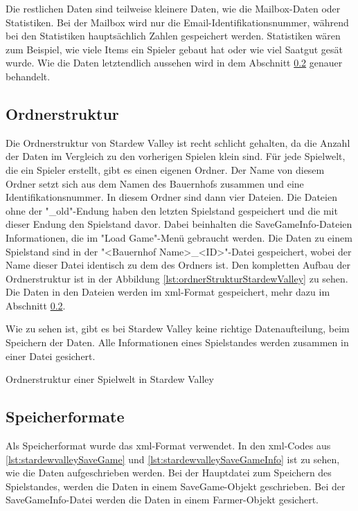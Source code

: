 Die restlichen Daten sind teilweise kleinere Daten, wie die Mailbox-Daten oder Statistiken. Bei der Mailbox wird nur die Email-Identifikationsnummer, während bei den Statistiken hauptsächlich Zahlen gespeichert werden. Statistiken wären zum Beispiel, wie viele Items ein Spieler gebaut hat oder wie viel Saatgut gesät wurde. Wie die Daten letztendlich aussehen wird in dem Abschnitt \ref{ssec:speicherformateStardew} genauer behandelt.

\subsection{Ordnerstruktur}
Die Ordnerstruktur von Stardew Valley ist recht schlicht gehalten, da die Anzahl der Daten im Vergleich zu den vorherigen Spielen klein sind. Für jede Spielwelt, die ein Spieler erstellt, gibt es einen eigenen Ordner. Der Name von diesem Ordner setzt sich aus dem Namen des Bauernhofs zusammen und eine Identifikationsnummer. In diesem Ordner sind dann vier Dateien. Die Dateien ohne der "\_old"-Endung haben den letzten Spielstand gespeichert und die mit dieser Endung den Spielstand davor. Dabei beinhalten die SaveGameInfo-Dateien Informationen, die im "Load Game"-Menü gebraucht werden. Die Daten zu einem Spielstand sind in der "<Bauernhof Name>\_<ID>"-Datei gespeichert, wobei der Name dieser Datei identisch zu dem des Ordners ist. Den kompletten Aufbau der Ordnerstruktur ist in der Abbildung \ref{lst:ordnerStrukturStardewValley} zu sehen. Die Daten in den Dateien werden im \ac{xml}-Format gespeichert, mehr dazu im Abschnitt \ref{ssec:speicherformateStardew}.\cite{stardewvalleywikiSaves}\cite{stardewvalleyFiles}

Wie zu sehen ist, gibt es bei Stardew Valley keine richtige Datenaufteilung, beim Speichern der Daten. Alle Informationen eines Spielstandes werden zusammen in einer Datei gesichert.

\begin{listing}[htp]
    \caption{Ordnerstruktur einer Spielwelt in Stardew Valley}
    \label{lst:ordnerStrukturStardewValley}
\end{listing}

\subsection{Speicherformate} \label{ssec:speicherformateStardew}
Als Speicherformat wurde das \ac{xml}-Format verwendet. In den \ac{xml}-Codes aus \ref{lst:stardewvalleySaveGame} und \ref{lst:stardewvalleySaveGameInfo} ist zu sehen, wie die Daten aufgeschrieben werden. Bei der Hauptdatei zum Speichern des Spielstandes, werden die Daten in einem SaveGame-Objekt geschrieben. Bei der SaveGameInfo-Datei werden die Daten in einem Farmer-Objekt gesichert.\cite{stardewvalleywikiSaves}

